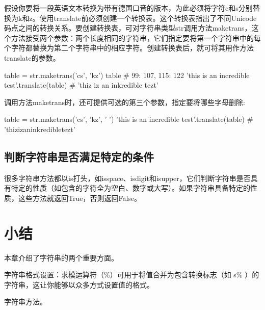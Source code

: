 假设你要将一段英语文本转换为带有德国口音的版本，为此必须将字符c和s分别替换为k和z。使用translate前必须创建一个转换表。这个转换表指出了不同Unicode码点之间的转换关系。要创建转换表，可对字符串类型str调用方法maketrans，这个方法接受两个参数：两个长度相同的字符串，它们指定要将第一个字符串中的每个字符都替换为第二个字符串中的相应字符。创建转换表后，就可将其用作方法translate的参数。

\begin{pyc}
table = str.maketrans('cs', 'kz')
table  # {99: 107, 115: 122}
'this is an incredible test'.translate(table)
# 'thiz iz an inkredible tezt'
\end{pyc}

调用方法maketrans时，还可提供可选的第三个参数，指定要将哪些字母删除:
\begin{pyc}
table = str.maketrans('cs', 'kz', ' ')
'this is an incredible test'.translate(table)  # 'thizizaninkredibletezt'
\end{pyc}

\subsection{判断字符串是否满足特定的条件}
很多字符串方法都以is打头，如isspace、isdigit和isupper，它们判断字符串是否具有特定的性质（如包含的字符全为空白、数字或大写）。如果字符串具备特定的性质，这些方法就返回True，否则返回False。

\section{小结}
本章介绍了字符串的两个重要方面。
\begin{dinglist}{43}
    \item 字符串格式设置：求模运算符（\%）可用于将值合并为包含转换标志（如 s\% ）的字符串，这让你能够以众多方式设置值的格式。
    \item 字符串方法。
\end{dinglist}